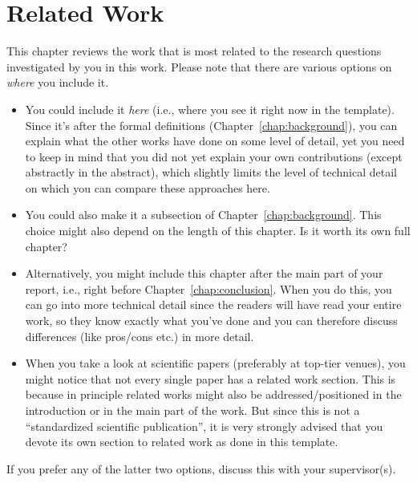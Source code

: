 \chapter{Related Work}\label{chap:relatedWork}

This chapter reviews the work that is most related to the research questions investigated by you in this work. Please note that there are various options on \emph{where} you include it.

\begin{itemize}
  \item You could include it \emph{here} (i.e., where you see it right now in the template). Since it's after the formal definitions (Chapter~\ref{chap:background}), you can explain what the other works have done on some level of detail, yet you need to keep in mind that you did not yet explain your own contributions (except abstractly in the abstract), which slightly limits the level of technical detail on which you can compare these approaches here.
  
  \item You could also make it a subsection of Chapter~\ref{chap:background}. This choice might also depend on the length of this chapter. Is it worth its own full chapter?

  \item Alternatively, you might include this chapter after the main part of your report, i.e., right before Chapter~\ref{chap:conclusion}. When you do this, you can go into more technical detail since the readers will have read your entire work, so they know exactly what you've done and you can therefore discuss differences (like pros/cons etc.) in more detail.

  \item When you take a look at scientific papers (preferably at top-tier venues), you might notice that not every single paper has a related work section. This is because in principle related works might also be addressed/positioned in the introduction or in the main part of the work. But since this is not a ``standardized scientific publication'', it is very strongly advised that you devote its own section to related work as done in this template.
\end{itemize}

If you prefer any of the latter two options, discuss this with your supervisor(s).
